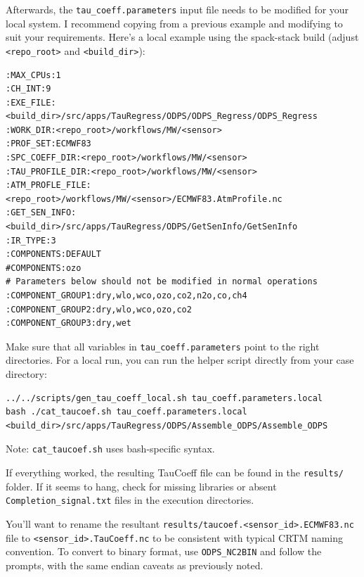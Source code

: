 Afterwards, the \verb|tau_coeff.parameters| input file needs to be modified for your local system.  I recommend copying from a previous example and modifying to suit your requirements.
Here's a local example using the spack-stack build (adjust \verb|<repo_root>| and \verb|<build_dir>|):
\begin{verbatim}
:MAX_CPUs:1
:CH_INT:9
:EXE_FILE:<build_dir>/src/apps/TauRegress/ODPS/ODPS_Regress/ODPS_Regress
:WORK_DIR:<repo_root>/workflows/MW/<sensor>
:PROF_SET:ECMWF83
:SPC_COEFF_DIR:<repo_root>/workflows/MW/<sensor>
:TAU_PROFILE_DIR:<repo_root>/workflows/MW/<sensor>
:ATM_PROFLE_FILE:<repo_root>/workflows/MW/<sensor>/ECMWF83.AtmProfile.nc
:GET_SEN_INFO:<build_dir>/src/apps/TauRegress/ODPS/GetSenInfo/GetSenInfo
:IR_TYPE:3
:COMPONENTS:DEFAULT
#COMPONENTS:ozo
# Parameters below should not be modified in normal operations
:COMPONENT_GROUP1:dry,wlo,wco,ozo,co2,n2o,co,ch4
:COMPONENT_GROUP2:dry,wlo,wco,ozo,co2
:COMPONENT_GROUP3:dry,wet
\end{verbatim}
Make sure that all variables in \verb|tau_coeff.parameters| point to the right directories.
For a local run, you can run the helper script directly from your case directory:
\begin{verbatim}
../../scripts/gen_tau_coeff_local.sh tau_coeff.parameters.local
bash ./cat_taucoef.sh tau_coeff.parameters.local <build_dir>/src/apps/TauRegress/ODPS/Assemble_ODPS/Assemble_ODPS
\end{verbatim}
Note: \verb|cat_taucoef.sh| uses bash-specific syntax.

If everything worked, the resulting TauCoeff file can be found in the \verb|results/| folder.  If it seems to hang, check for missing libraries or absent \verb|Completion_signal.txt| files in the execution directories.

You'll want to rename the resultant \verb|results/taucoef.<sensor_id>.ECMWF83.nc| file to \verb|<sensor_id>.TauCoeff.nc| to be consistent with typical CRTM naming convention.  
To convert to binary format, use \verb|ODPS_NC2BIN| and follow the prompts, with the same endian caveats as previously noted. 


